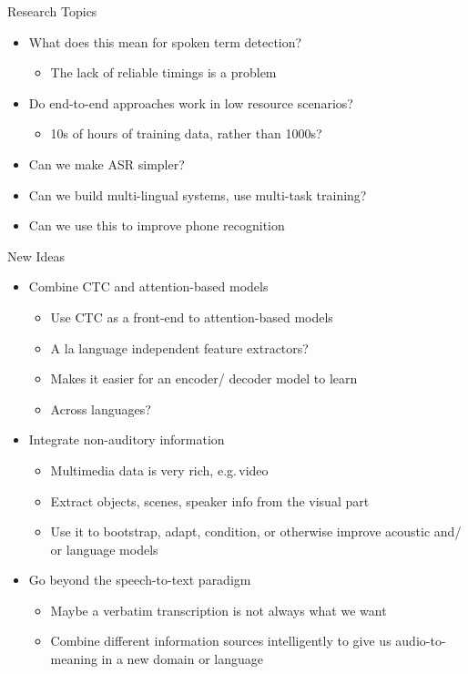 \begin{frame}{Research Topics}
  \begin{itemize}
  \item What does this mean for spoken term detection?
    \begin{itemize}
    \item The lack of reliable timings is a problem
    \end{itemize}
  \item Do end-to-end approaches work in low resource scenarios?
    \begin{itemize}
    \item 10s of hours of training data, rather than 1000s?
    \end{itemize}
  \item Can we make ASR simpler?
  \item Can we build multi-lingual systems, use multi-task training?
  \item Can we use this to improve phone recognition
  \end{itemize}
\end{frame}

\begin{frame}{New Ideas}
  \begin{itemize}
  \item Combine CTC and attention-based models
    \begin{itemize}
    \item Use CTC as a front-end to attention-based models
    \item A la language independent feature extractors?
    \item Makes it easier for an encoder/ decoder model to learn
    \item Across languages?
    \end{itemize}
  \item Integrate non-auditory information
    \begin{itemize}
    \item Multimedia data is very rich, e.g.\,video
    \item Extract objects, scenes, speaker info from the visual part
    \item Use it to bootstrap, adapt, condition, or otherwise improve acoustic and/ or language models
    \end{itemize}
  \item Go beyond the speech-to-text paradigm
    \begin{itemize}
    \item Maybe a verbatim transcription is not always what we want
    \item Combine different information sources intelligently to give us audio-to-meaning in a new domain or language
    \end{itemize}
  \end{itemize}
\end{frame}


